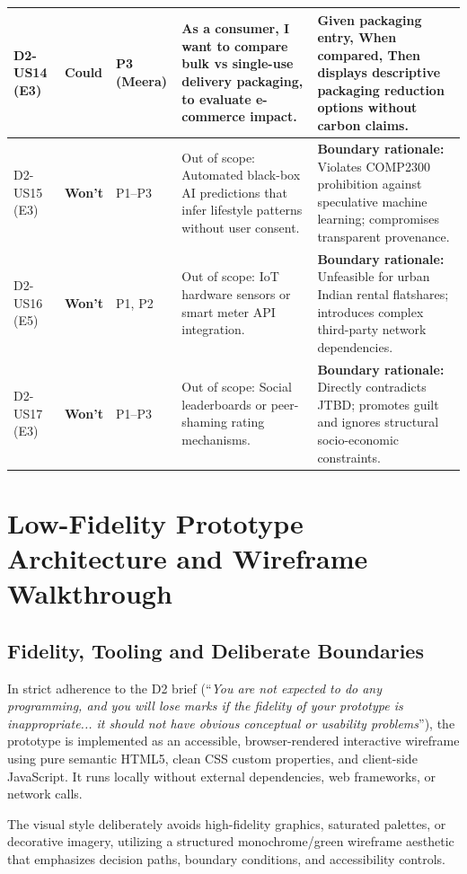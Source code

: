 \documentclass[12pt,a4paper]{article}
\begin{document}
\begin{table}[ht]
\begin{tabularx}{\textwidth}{@{}p{1.2cm}p{1.3cm}p{1.5cm}Xp{4.8cm}@{}}
D2-US14 (E3) & \textbf{Could} & P3 (Meera) & As a consumer, I want to compare bulk vs single-use delivery packaging, to evaluate e-commerce impact. & \textbf{Given} packaging entry, \textbf{When} compared, \textbf{Then} displays descriptive packaging reduction options without carbon claims.\\
\midrule
D2-US15 (E3) & \textbf{Won't} & P1--P3 & Out of scope: Automated black-box AI predictions that infer lifestyle patterns without user consent. & \textbf{Boundary rationale:} Violates COMP2300 prohibition against speculative machine learning; compromises transparent provenance.\\
D2-US16 (E5) & \textbf{Won't} & P1, P2 & Out of scope: IoT hardware sensors or smart meter API integration. & \textbf{Boundary rationale:} Unfeasible for urban Indian rental flatshares; introduces complex third-party network dependencies.\\
D2-US17 (E3) & \textbf{Won't} & P1--P3 & Out of scope: Social leaderboards or peer-shaming rating mechanisms. & \textbf{Boundary rationale:} Directly contradicts JTBD; promotes guilt and ignores structural socio-economic constraints.\\
\bottomrule
\end{tabularx}
\end{table}

\section{Low-Fidelity Prototype Architecture and Wireframe Walkthrough}

\subsection{Fidelity, Tooling and Deliberate Boundaries}
In strict adherence to the D2 brief (``\emph{You are not expected to do any programming, and you will lose marks if the fidelity of your prototype is inappropriate... it should not have obvious conceptual or usability problems}''), the prototype is implemented as an accessible, browser-rendered interactive wireframe using pure semantic HTML5, clean CSS custom properties, and client-side JavaScript. It runs locally without external dependencies, web frameworks, or network calls.

The visual style deliberately avoids high-fidelity graphics, saturated palettes, or decorative imagery, utilizing a structured monochrome/green wireframe aesthetic that emphasizes decision paths, boundary conditions, and accessibility controls.
\end{document}
